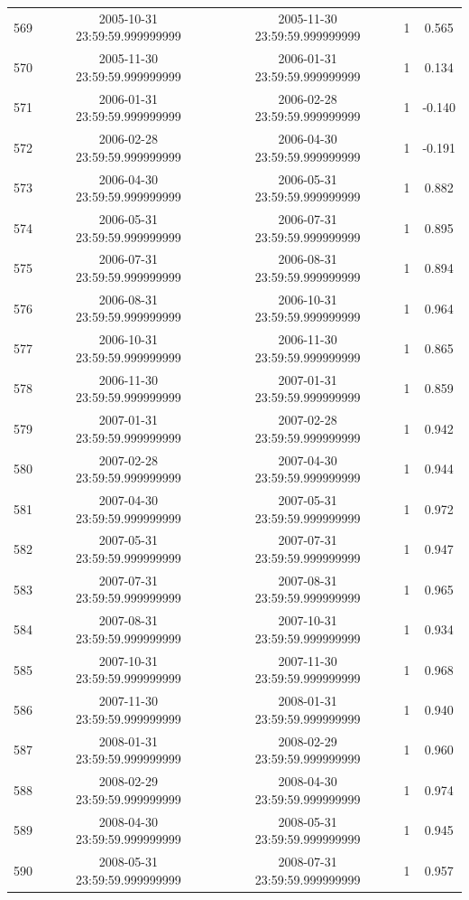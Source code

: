 \begin{table}
\begin{tabular}{lcccc}
569 & 2005-10-31 23:59:59.999999999 & 2005-11-30 23:59:59.999999999 & 1 & 0.565 \\
570 & 2005-11-30 23:59:59.999999999 & 2006-01-31 23:59:59.999999999 & 1 & 0.134 \\
571 & 2006-01-31 23:59:59.999999999 & 2006-02-28 23:59:59.999999999 & 1 & -0.140 \\
572 & 2006-02-28 23:59:59.999999999 & 2006-04-30 23:59:59.999999999 & 1 & -0.191 \\
573 & 2006-04-30 23:59:59.999999999 & 2006-05-31 23:59:59.999999999 & 1 & 0.882 \\
574 & 2006-05-31 23:59:59.999999999 & 2006-07-31 23:59:59.999999999 & 1 & 0.895 \\
575 & 2006-07-31 23:59:59.999999999 & 2006-08-31 23:59:59.999999999 & 1 & 0.894 \\
576 & 2006-08-31 23:59:59.999999999 & 2006-10-31 23:59:59.999999999 & 1 & 0.964 \\
577 & 2006-10-31 23:59:59.999999999 & 2006-11-30 23:59:59.999999999 & 1 & 0.865 \\
578 & 2006-11-30 23:59:59.999999999 & 2007-01-31 23:59:59.999999999 & 1 & 0.859 \\
579 & 2007-01-31 23:59:59.999999999 & 2007-02-28 23:59:59.999999999 & 1 & 0.942 \\
580 & 2007-02-28 23:59:59.999999999 & 2007-04-30 23:59:59.999999999 & 1 & 0.944 \\
581 & 2007-04-30 23:59:59.999999999 & 2007-05-31 23:59:59.999999999 & 1 & 0.972 \\
582 & 2007-05-31 23:59:59.999999999 & 2007-07-31 23:59:59.999999999 & 1 & 0.947 \\
583 & 2007-07-31 23:59:59.999999999 & 2007-08-31 23:59:59.999999999 & 1 & 0.965 \\
584 & 2007-08-31 23:59:59.999999999 & 2007-10-31 23:59:59.999999999 & 1 & 0.934 \\
585 & 2007-10-31 23:59:59.999999999 & 2007-11-30 23:59:59.999999999 & 1 & 0.968 \\
586 & 2007-11-30 23:59:59.999999999 & 2008-01-31 23:59:59.999999999 & 1 & 0.940 \\
587 & 2008-01-31 23:59:59.999999999 & 2008-02-29 23:59:59.999999999 & 1 & 0.960 \\
588 & 2008-02-29 23:59:59.999999999 & 2008-04-30 23:59:59.999999999 & 1 & 0.974 \\
589 & 2008-04-30 23:59:59.999999999 & 2008-05-31 23:59:59.999999999 & 1 & 0.945 \\
590 & 2008-05-31 23:59:59.999999999 & 2008-07-31 23:59:59.999999999 & 1 & 0.957 \\

\end{tabular}
\end{table}
